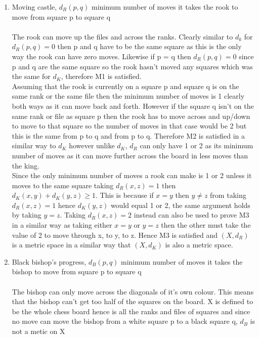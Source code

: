 \documentclass[,oneside]{article}
\numberwithin{equation}{section}
\begin{document}
\begin{enumerate}[label=(\roman*)]
   \item Moving castle, $d_R(p,q)$ minimum number of moves it takes the rook to move from square p to square q\\
   \\ The rook can move up the files and across the ranks. Clearly similar to $d_k$ for $d_R(p,q)=0$ then p and q have to be the same square as this is the only way the rook can have zero moves. Likewise if p = q then $d_R(p,q)=0$ since p and q are the same square so the rook hasn't moved any squares which was the same for $d_K$, therefore M1 is satisfied.\\ Assuming that the rook is currently on a square p and square q is on the same rank or the same file then the minimum number of moves is 1 clearly both ways as it can move back and forth. However if the square q isn't on the same rank or file as square p then the rook has to move across and up/down to move to that square so the number of moves in that case would be 2 but this is the same from p to q and from p to q. Therefore M2 is satisfied in a similar way to $d_K$ however unlike $d_K$, $d_R$ can only have 1 or 2 as its minimum number of moves as it can move further across the board in less moves than the king. \\Since the only minimum number of moves a rook can make is 1 or 2 unless it moves to the same square taking $d_R(x,z)=1$ then $d_K(x,y)+d_K(y,z) \geq 1$. This is because if $x = y$ then $y \neq z$ from taking $d_R(x,z)=1$ hence $d_K(y,z)$ would equal 1 or 2, the same argument holds by taking $y = z$. Taking $d_R(x,z)=2$ instead can also be used to prove M3 in a similar way as taking either $x=y$ or $y=z$ then the other must take the value of 2 to move through x, to y, to z. Hence M3 is satisfied and $(X, d_R)$ is a metric space in a similar way that $(X, d_K)$ is also a metric space.\\
   
  \item Black bishop's progress, $d_B(p,q)$ minimum number of moves it takes the bishop to move from square p to square q\\
   \\ The bishop can only move across the diagonals of it's own colour. This means that the bishop can't get too half of the squares on the board. X is defined to be the whole chess board hence is all the ranks and files of squares and since no move can move the bishop from a white square p to a black square q, $d_B$ is not a metic on X\\
   

\end{enumerate}
\end{document}
